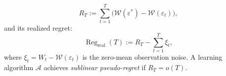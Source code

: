 \begin{equation}
\label{eq:pseudo_regret}
R_T := \sum_{t=1}^T \bigl(\mathcal{W}(\varepsilon^*) - \mathcal{W}(\varepsilon_t)\bigr),
\end{equation}
and its realized regret:
\begin{equation}
\label{eq:regret}
\operatorname{Reg}_{\text{real}}(T) := R_T - \sum_{t=1}^T \xi_t,
\end{equation}
where $\xi_t = W_t - \mathcal{W}(\varepsilon_t)$ is the zero-mean observation noise. A learning algorithm $\mathcal{A}$ achieves \emph{sublinear pseudo-regret} if $R_T = o(T)$.

